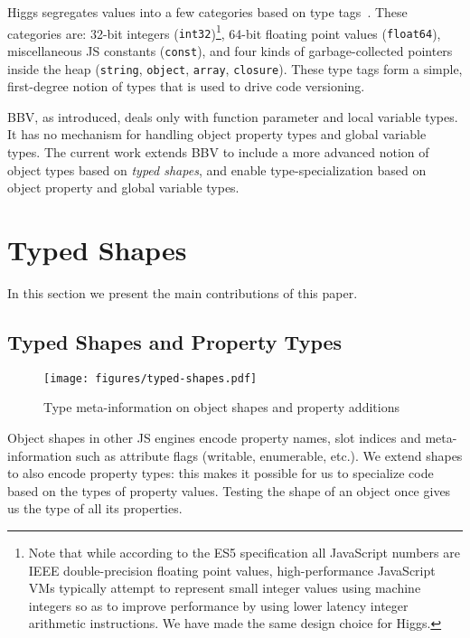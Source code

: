 \documentclass[preprint]{sigplanconf}
\begin{document}
Higgs segregates values into a few categories based on
type tags~\cite{type_tags}. These categories are: 32-bit integers
({\tt int32})\footnote{Note that while according to the ES5 specification
all JavaScript numbers are
IEEE double-precision floating point values, high-performance JavaScript
VMs typically attempt to represent small integer values
using machine integers so as to improve performance by using
lower latency integer arithmetic instructions. We have made the same design
choice for Higgs.}, 64-bit floating point values ({\tt float64}),
miscellaneous JS
constants ({\tt const}), and four kinds of garbage-collected pointers inside
the heap ({\tt string}, {\tt object}, {\tt array}, {\tt closure}). These
type tags form a simple, first-degree notion of types that is used to drive
code versioning.

BBV, as introduced, deals only with function parameter and local variable
types. It has no mechanism for handling object property types and global
variable types. The current work extends BBV to include a more advanced notion
of object types based on {\em typed shapes}, and enable type-specialization 
based on object property and global variable types.

 
\section{Typed Shapes}
In this section we present the main contributions of this paper.

\subsection{Typed Shapes and Property Types\label{sec:typed_shapes}}

\begin{figure*}[tb]
\begin{center}
\texttt{[image: figures/typed-shapes.pdf]}
\end{center}
\caption{Type meta-information on object shapes and property additions\label{fig:typed-shapes}}
\end{figure*}

Object shapes in other JS engines encode property names, slot indices and
meta-information such as attribute flags (writable, enumerable, etc.). We
extend shapes to also encode property types: this makes
it possible for us to specialize code based on the types of property values.
Testing the shape of an object once gives us the type of all its properties.
\end{document}
